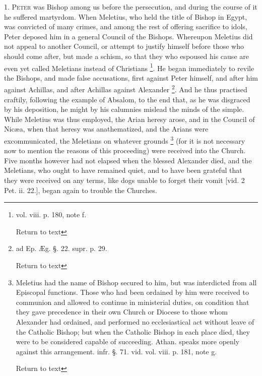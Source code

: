 1. P\textsc{eter} was Bishop among
us before the persecution, and during the course of it he suffered
martyrdom. When Meletius, who held the title of Bishop in Egypt, was
convicted of many crimes, and among the rest of offering sacrifice to
idols, Peter deposed him in a general Council of the Bishops.
Whereupon Meletius did not appeal to another Council, or attempt to
justify himself before those who should come after, but made a schism,
so that they who espoused his cause are even yet called Meletians
instead of Christians \footnote{vol. viii. p. 180, note f.

Return to text}.
He began immediately to revile the Bishops, and made false
accusations, first against Peter himself, and after him against
Achillas, and after Achillas against Alexander \footnote{ad Ep. Æg. §. 22. supr. p. 29.

Return to text}. And he thus practised craftily, following the example of
Absalom, to the end that, as he was disgraced by his deposition, he
might by his calumnies mislead the minds of the simple. While Meletius
was thus employed, the Arian heresy arose, and in the Council of Nicæa,
when that heresy was anathematized, and the Arians were
excommunicated, the Meletians on whatever grounds \footnote{Meletius had the name of Bishop secured to
him, but was interdicted from all Episcopal functions. Those who had
been ordained by him were received to communion and allowed to
continue in ministerial duties, on condition that they gave precedence
in their own Church or Diocese to those whom Alexander had ordained,
and performed no ecclesiastical act without leave of the Catholic
Bishop; but when the Catholic Bishop in each place died, they were to
be considered capable of succeeding. Athan. speaks more openly against
this arrangement. infr. §. 71. vid. vol. viii. p. 181, note g.

Return to text} (for it is not necessary now to mention the reasons of this
proceeding) were received into the Church. Five months however had not
elapsed when the blessed Alexander died, and the Meletians, who ought
to have remained quiet, and to have been grateful that they were
received on any terms, like dogs unable to forget their vomit [vid. 2
Pet. ii. 22.], began again to trouble the Churches.

